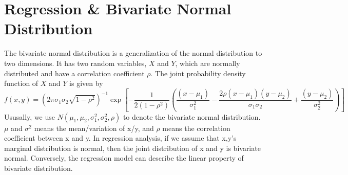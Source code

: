 \documentclass{article}
\begin{document}

\section{Regression \& Bivariate Normal Distribution}
The bivariate normal distribution is a generalization of the normal distribution to two dimensions. It has two random variables, $X$ and $Y$, which are normally distributed and have a correlation coefficient $\rho$. The joint probability density function of $X$ and $Y$ is given by
$$ f(x,y)=(2\pi \sigma_1\sigma_2\sqrt{1-\rho^2})^{-1}\exp [-\frac{1}{2(1-\rho^2)}\left(\frac{(x-\mu_1)}{\sigma_1^2}-\frac{2\rho(x-\mu_1)(y-\mu_2)}{\sigma_1\sigma_2}+\frac{(y-\mu_2)}{\sigma_2^2}\right)] $$
Ususally, we use $N(\mu_1,\mu_2,\sigma_1^2,\sigma_2^2,\rho)$ to denote the bivariate normal distribution. $\mu$ and $\sigma^2$ means the mean/variation of x/y, and $\rho$ means the correlation coefficient between x and y. In regression analysis, if we assume that x,y's marginal distribution is normal, then the joint distribution of x and y is bivariate normal. Conversely, the regression model can describe the linear property of bivariate distribution. \par
\end{document}
